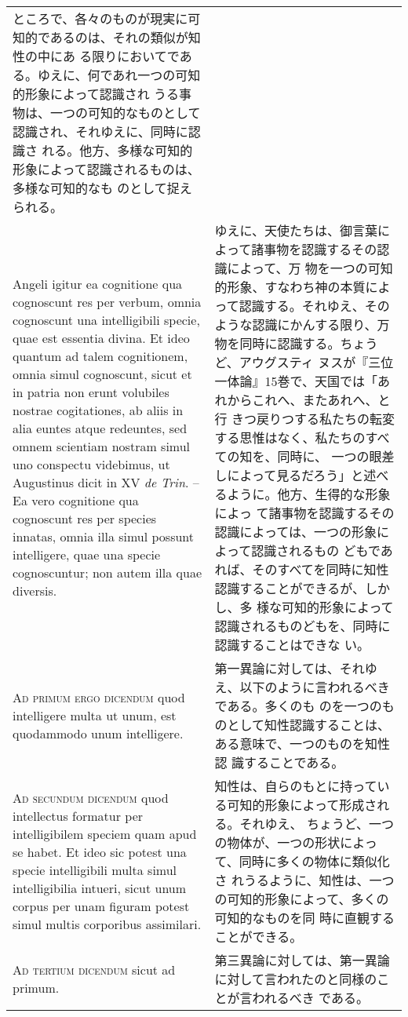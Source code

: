 \documentclass[10pt]{jsarticle} %
\begin{document}
\begin{longtable}{p{21em}p{21em}}
ところで、各々のものが現実に可知的であるのは、それの類似が知性の中にあ
る限りにおいてである。ゆえに、何であれ一つの可知的形象によって認識され
うる事物は、一つの可知的なものとして認識され、それゆえに、同時に認識さ
れる。他方、多様な可知的形象によって認識されるものは、多様な可知的なも
のとして捉えられる。


\\


Angeli igitur ea cognitione qua cognoscunt res per verbum, omnia
cognoscunt una intelligibili specie, quae est essentia divina. Et ideo
quantum ad talem cognitionem, omnia simul cognoscunt, sicut et in
patria non erunt volubiles nostrae cogitationes, ab aliis in alia
euntes atque redeuntes, sed omnem scientiam nostram simul uno
conspectu videbimus, ut Augustinus dicit in XV {\itshape de
Trin}. --Ea vero cognitione qua cognoscunt res per species innatas,
omnia illa simul possunt intelligere, quae una specie cognoscuntur;
non autem illa quae diversis.


&

ゆえに、天使たちは、御言葉によって諸事物を認識するその認識によって、万
物を一つの可知的形象、すなわち神の本質によって認識する。それゆえ、その
ような認識にかんする限り、万物を同時に認識する。ちょうど、アウグスティ
ヌスが『三位一体論』15巻で、天国では「あれからこれへ、またあれへ、と行
きつ戻りつする私たちの転変する思惟はなく、私たちのすべての知を、同時に、
一つの眼差しによって見るだろう」と述べるように。他方、生得的な形象によっ
て諸事物を認識するその認識によっては、一つの形象によって認識されるもの
どもであれば、そのすべてを同時に知性認識することができるが、しかし、多
様な可知的形象によって認識されるものどもを、同時に認識することはできな
い。



\\


{\scshape Ad primum ergo dicendum} quod intelligere multa ut unum, est
quodammodo unum intelligere.


&

第一異論に対しては、それゆえ、以下のように言われるべきである。多くのも
のを一つのものとして知性認識することは、ある意味で、一つのものを知性認
識することである。


\\


{\scshape Ad secundum dicendum} quod intellectus formatur per
intelligibilem speciem quam apud se habet. Et ideo sic potest una
specie intelligibili multa simul intelligibilia intueri, sicut unum
corpus per unam figuram potest simul multis corporibus assimilari.


&

知性は、自らのもとに持っている可知的形象によって形成される。それゆえ、
ちょうど、一つの物体が、一つの形状によって、同時に多くの物体に類似化さ
れうるように、知性は、一つの可知的形象によって、多くの可知的なものを同
時に直観することができる。


\\

{\scshape Ad tertium dicendum} sicut ad primum.
&

第三異論に対しては、第一異論に対して言われたのと同様のことが言われるべき
である。

\end{longtable}
\end{document}
